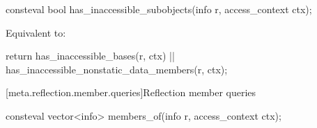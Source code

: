 %
\begin{itemdecl}
consteval bool has_inaccessible_subobjects(info r, access_context ctx);
\end{itemdecl}

\begin{itemdescr}
\pnum
\effects
Equivalent to:
\begin{codeblock}
return has_inaccessible_bases(r, ctx) || has_inaccessible_nonstatic_data_members(r, ctx);
\end{codeblock}
\end{itemdescr}

[meta.reflection.member.queries]{Reflection member queries}

%
\begin{itemdecl}
consteval vector<info> members_of(info r, access_context ctx);
\end{itemdecl}

